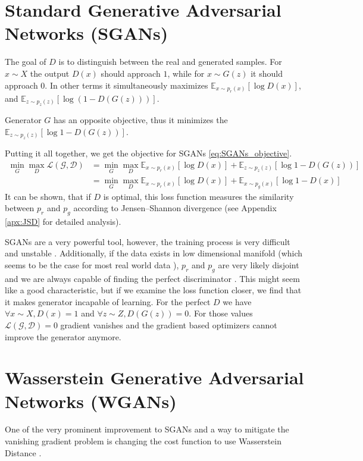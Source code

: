 \section{Standard Generative Adversarial Networks (SGANs)}
The goal of $D$ is to distinguish between the real and generated samples. For $x
\sim X$ the output $D(x)$ should approach $1$, while for $x \sim G(z)$ it should
approach $0$. In other terms it simultaneously maximizes $\mathbb{E}_{x \sim
  p_r(x)}[\log{D(x)}]$, and $\mathbb{E}_{z \sim p_z(z)}[\log{(1 - D(G(z)))}]$.

Generator $G$ has an opposite objective, thus it minimizes the $\mathbb{E}_{z
  \sim p_z(z)}[\log{1 - D(G(z))}]$.

Putting it all together, we get the objective for SGANs \ref{eq:SGANs_objective}.
\begin{equation}
  \label{eq:SGANs_objective}
  \begin{split}
    \min_G\max_D\mathcal{L(G, D)} & = \min_G\max_D \mathbb{E}_{x \sim p_r(x)}[\log{D(x)}] +  \mathbb{E}_{z \sim p_z(z)}[\log{1 - D(G(z))}] \\
    & = \min_G\max_D \mathbb{E}_{x \sim p_r(x)}[\log{D(x)}] +  \mathbb{E}_{x \sim p_g(x)}[\log{1 - D(x)}]
  \end{split}
\end{equation}
It can be shown, that if $D$ is optimal, this loss function measures the similarity between 
$p_r$ and $p_g$ according to Jensen–Shannon divergence (see Appendix
\ref{apx:JSD} for detailed analysis). 

SGANs are a very powerful tool, however, the training process is very difficult
and unstable \cite{salimans2016improved}. Additionally, if the data exists in
low dimensional manifold (which seems to be the case for most real world data
\cite{narayanan2010proceedings}), $p_r$ and $p_g$ are very likely disjoint and we are always capable of finding the perfect discriminator 
\cite{arjovsky2017principled}. This might seem like a good
characteristic, but if we examine the loss function closer, we find that it
makes generator incapable of learning. For the perfect $D$ we have $\forall x
\sim X, D(x) = 1$ and $\forall z \sim Z, D(G(z)) = 0$. For those values
$\mathcal{L(G,D)} = 0$ gradient vanishes and the gradient based optimizers cannot improve the
generator anymore.
\section{Wasserstein Generative Adversarial Networks (WGANs)}
One of the very prominent improvement to SGANs and a way to mitigate the
vanishing gradient problem is changing the cost function to use Wasserstein
Distance \cite{arjovsky2017wasserstein}.

